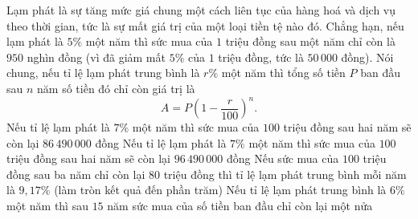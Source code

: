 \begin{ex}%
	Lạm phát là sự tăng mức giá chung một cách liên tục của hàng hoá và dịch vụ theo thời gian, tức là sự mất giá trị của một loại tiền tệ nào đó. Chẳng hạn, nếu lạm phát là $5\%$ một năm thì sức mua của $1$ triệu đồng sau một năm chỉ  còn là $950$ nghìn đồng (vì đã giảm mất $5\%$ của $1$ triệu đồng, tức là $50\,000$ đồng).
	Nói chung, nếu tỉ lệ lạm  phát trung bình là $r\%$ một năm thì tổng số tiền $P$ ban đầu sau $n$ năm số tiền đó chỉ còn giá trị là
	 \[
	A = P\left(1 - \dfrac{r}{100}\right)^n. 
	 \]
	 \choiceTF
		{\True Nếu tỉ lệ lạm phát là $7\%$ một năm thì sức mua của $100$ triệu đồng sau hai năm sẽ  còn lại $86\,490\,000$ đồng}
		{Nếu tỉ lệ lạm  phát là $7\%$ một năm thì sức mua của $100$ triệu đồng sau hai năm sẽ còn lại $96\,490\,000$ đồng}
		{Nếu sức mua của $100$ triệu đồng sau ba năm chỉ còn lại $80$ triệu đồng thì tỉ lệ lạm phát trung bình mỗi năm  là $9{,}17\%$ (làm tròn kết quả đến phần trăm)}
		 {Nếu tỉ lệ lạm phát trung bình là $6\%$ một năm thì sau $15$ năm sức mua của số tiền ban đầu chỉ còn lại một nửa}
\end{ex}

